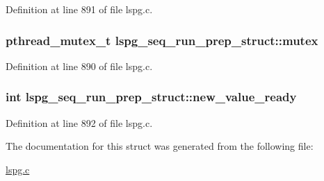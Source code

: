 Definition at line 891 of file lspg.\-c.

\hypertarget{structlspg__seq__run__prep__struct_ad146cb91b5f7dd8bb283092c28781fe7}{
\subsubsection[{mutex}]{\setlength{\rightskip}{0pt plus 5cm}pthread\-\_\-mutex\-\_\-t lspg\-\_\-seq\-\_\-run\-\_\-prep\-\_\-struct\-::mutex}}\label{structlspg__seq__run__prep__struct_ad146cb91b5f7dd8bb283092c28781fe7}


Definition at line 890 of file lspg.\-c.

\hypertarget{structlspg__seq__run__prep__struct_a42d08888327e9059ddd69ddfec31b8a9}{
\subsubsection[{new\-\_\-value\-\_\-ready}]{\setlength{\rightskip}{0pt plus 5cm}int lspg\-\_\-seq\-\_\-run\-\_\-prep\-\_\-struct\-::new\-\_\-value\-\_\-ready}}\label{structlspg__seq__run__prep__struct_a42d08888327e9059ddd69ddfec31b8a9}


Definition at line 892 of file lspg.\-c.



The documentation for this struct was generated from the following file\-:\begin{DoxyCompactItemize}
\item 
\hyperlink{lspg_8c}{lspg.\-c}\end{DoxyCompactItemize}
